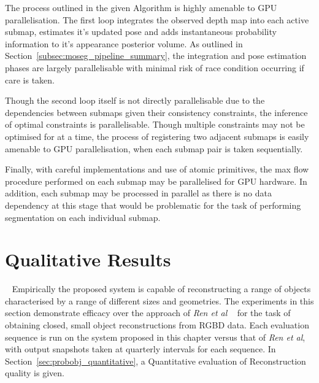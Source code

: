 The process outlined in the given Algorithm is highly amenable to GPU parallelisation. 
The first loop integrates the observed depth map into each active submap, estimates it's updated 
pose and adds instantaneous probability information to it's appearance posterior volume. As 
outlined in Section~\ref{subsec:moseg_pipeline_summary}, the integration and pose estimation phases 
are largely parallelisable with minimal risk of race condition occurring if care is taken.

Though the second loop itself is not directly parallelisable due to the dependencies between submaps 
given their consistency constraints, the inference of optimal constraints is parallelisable. Though 
multiple constraints may not be optimised for at a time, the process of registering two adjacent 
submaps is easily amenable to GPU parallelisation, when each submap pair is taken sequentially.

Finally, with careful implementations and use of atomic primitives, the max flow procedure performed 
on each submap may be parallelised for GPU hardware. In addition, each submap may be processed in 
parallel as there is no data dependency at this stage that would be problematic for the task of 
performing segmentation on each individual submap.

\section{Qualitative Results}
~\label{sec:probobj_qualitative}
Empirically the proposed system is capable of reconstructing a range of objects 
characterised by a range of different sizes and geometries. The experiments in 
this section demonstrate efficacy over the approach of \textit{Ren et al} 
~\cite{Ren2013} for the task of obtaining closed, small object reconstructions 
from RGBD data. Each evaluation sequence is run on the system proposed in this 
chapter versus that of \textit{Ren et al}, with output snapshots taken at 
quarterly intervals for each sequence. In Section~\ref{sec:probobj_quantitative}, 
a Quantitative evaluation of Reconstruction quality is given.

